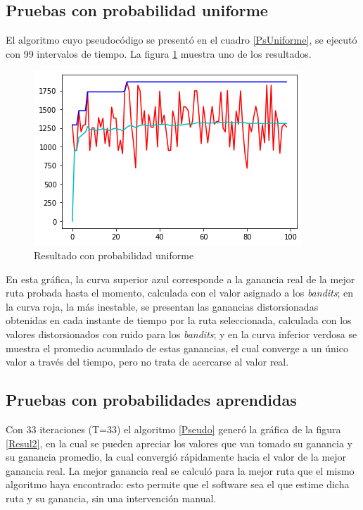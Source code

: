 \subsection{Pruebas con probabilidad uniforme}

El algoritmo cuyo pseudocódigo se presentó en el cuadro \ref{PsUniforme}, se ejecutó con 99 intervalos de tiempo. La figura \ref{fig:uniforme} muestra uno de los resultados. 

\begin{figure}[H]
	\centering
	\includegraphics[scale=1]{Uniforme}
	\caption{Resultado con probabilidad uniforme}
	\label{fig:uniforme}
\end{figure}

En esta gráfica, la curva superior azul corresponde a la ganancia real de la mejor ruta probada hasta el momento, calculada con el valor asignado a los \textit{bandits}; en la curva roja, la más inestable, se presentan las ganancias distorsionadas obtenidas en cada instante de tiempo por la ruta seleccionada, calculada con los valores distorsionados con ruido para los \textit{bandits}; y en la curva inferior verdosa se muestra el promedio acumulado de estas ganancias, el cual converge a un único valor a través del tiempo, pero no trata de acercarse al valor real.

\subsection{Pruebas con probabilidades aprendidas}

Con 33 iteraciones (T=33) el algoritmo \ref{Pseudo} generó la gráfica de la figura \ref{Resul2}, en la cual se pueden apreciar los valores que van tomado su ganancia y su ganancia promedio, la cual convergió rápidamente hacia el valor de la mejor ganancia real. La mejor ganancia real se calculó para la mejor ruta que el mismo algoritmo haya encontrado: esto permite que el software sea el que estime dicha ruta y su ganancia, sin una intervención manual.

